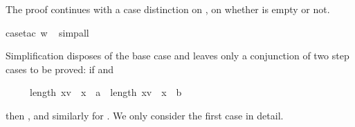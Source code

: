 \begin{isabellebody}
\begin{isamarkuptxt}
The proof continues with a case distinction on ,
on whether  is empty or not.%
\end{isamarkuptxt}%
\isamarkuptrue%
\isamarkupfalse%
{\isacharparenleft}case{\isacharunderscore}tac\ w{\isacharparenright}\isanewline
\ \isamarkupfalse%
{\isacharparenleft}simp{\isacharunderscore}all{\isacharparenright}%
\begin{isamarkuptxt}%
\noindent
Simplification disposes of the base case and leaves only a conjunction
of two step cases to be proved:
if  and \begin{isabelle}%
\ \ \ \ \ length\ {\isacharbrackleft}x{\isasymin}v\ {\isachardot}\ x\ {\isacharequal}\ a{\isacharbrackright}\ {\isacharequal}\ length\ {\isacharbrackleft}x{\isasymin}v\ {\isachardot}\ x\ {\isacharequal}\ b{\isacharbrackright}\ {\isacharplus}\ {}%
\end{isabelle} then
, and similarly for .
We only consider the first case in detail.


\end{isamarkuptxt}
\end{isabellebody}
